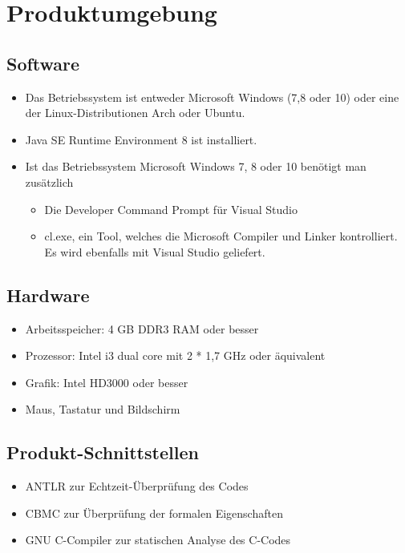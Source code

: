\documentclass[a4paper]{scrreprt}
\begin{document}
\chapter{Produktumgebung}

\section{Software}
\begin{itemize}
\item Das Betriebssystem ist entweder Microsoft Windows (7,8 oder 10) oder eine der Linux-Distributionen Arch oder Ubuntu.
\item Java SE Runtime Environment 8 ist installiert.
\item Ist das Betriebssystem Microsoft Windows 7, 8 oder 10 benötigt man zusätzlich
\begin{itemize}
\item Die Developer Command Prompt für Visual Studio
\item cl.exe, ein Tool, welches die Microsoft Compiler und Linker kontrolliert. Es wird ebenfalls mit Visual Studio geliefert.
\end{itemize}
\end{itemize}

\section{Hardware}
\begin{itemize}
\item Arbeitsspeicher: 4 GB DDR3 RAM oder besser
\item Prozessor: Intel i3 dual core mit 2 * 1,7 GHz oder äquivalent
\item Grafik: Intel HD3000 oder besser
\item Maus, Tastatur und Bildschirm
\end{itemize}

\section{Produkt-Schnittstellen}
\begin{itemize}
\item ANTLR zur Echtzeit-Überprüfung des Codes
\item CBMC zur Überprüfung der formalen Eigenschaften
\item GNU C-Compiler zur statischen Analyse des C-Codes
\end{itemize}
\end{document}
